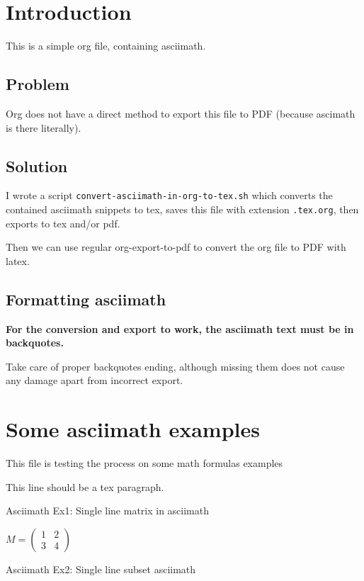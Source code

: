 \documentclass[11pt]{article}
\author{mzimmermann}
\date{\today}
\title{}
\begin{document}
\tableofcontents

\section{Introduction}
\label{sec:orgc62cd38}

This is a simple org file, containing asciimath.
\subsection{Problem}
\label{sec:org7a7870a}

Org does not have a direct method to export this file to PDF (because ascimath is there literally).
\subsection{Solution}
\label{sec:org96be3ec}

I wrote a script \texttt{convert-asciimath-in-org-to-tex.sh} which converts the contained asciimath snippets to tex, saves this file with extension \texttt{.tex.org}, then exports to tex and/or pdf. 

Then we can use regular org-export-to-pdf to convert the org file to PDF with latex.
\subsection{Formatting asciimath}
\label{sec:org3573c59}

\textbf{For the conversion and export to work, the asciimath text must be in backquotes.}

Take care of proper backquotes ending, although missing them does not cause any damage apart from incorrect export.
\section{Some asciimath examples}
\label{sec:orgfe5cfdc}

This file is testing the process on some math formulas examples


This line should be a tex paragraph.


Asciimath Ex1: Single line matrix in asciimath

\(M = \left ( \begin{matrix} 1 & 2 \\ 3 & 4 \end{matrix} \right )\)

Asciimath Ex2: Single line subset asciimath
\end{document}
